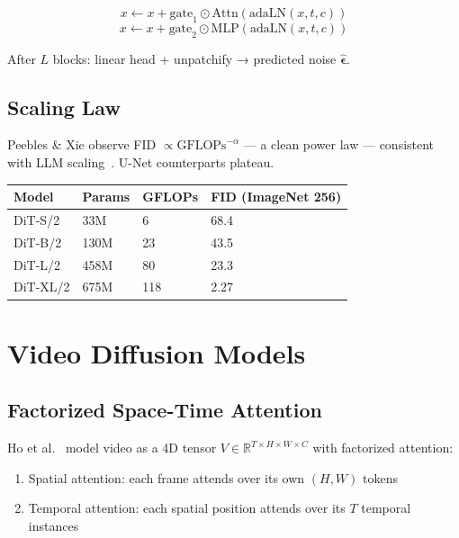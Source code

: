 \documentclass[11pt, a4paper]{article}
\theoremstyle{definition}
\begin{document}
\begin{equation}
  x \leftarrow x + \text{gate}_1 \odot \text{Attn}(\text{adaLN}(x, t, c))
\end{equation}
\begin{equation}
  x \leftarrow x + \text{gate}_2 \odot \text{MLP}(\text{adaLN}(x, t, c))
\end{equation}

After $L$ blocks: linear head + unpatchify → predicted noise $\hat{\bm{\epsilon}}$.

\subsection{Scaling Law}

Peebles \& Xie observe FID $\propto \text{GFLOPs}^{-\alpha}$ — a clean power law — consistent
with LLM scaling~\cite{kaplan2020scaling}. U-Net counterparts plateau.

\begin{center}
\begin{tabular}{llll}
\toprule
Model & Params & GFLOPs & FID (ImageNet 256) \\
\midrule
DiT-S/2 & 33M & 6 & 68.4 \\
DiT-B/2 & 130M & 23 & 43.5 \\
DiT-L/2 & 458M & 80 & 23.3 \\
DiT-XL/2 & 675M & 118 & 2.27 \\
\bottomrule
\end{tabular}
\end{center}

\section{Video Diffusion Models}

\subsection{Factorized Space-Time Attention}

Ho et al.~\cite{ho2022video} model video as a 4D tensor $V \in \mathbb{R}^{T \times H \times W \times C}$
with factorized attention:
\begin{enumerate}
  \item Spatial attention: each frame attends over its own $(H, W)$ tokens
  \item Temporal attention: each spatial position attends over its $T$ temporal instances
\end{enumerate}
\end{document}
